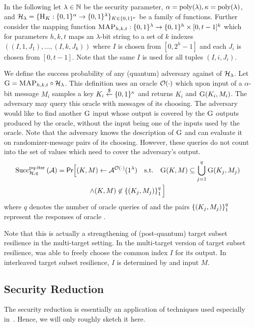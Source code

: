 In the following
let $\lambda\in\NN$ be the security parameter, $\alpha=\poly(\lambda),\kappa =\poly(\lambda)$, and
$\hf_\lambda = \{\h_K: \bin^{\alpha} \rightarrow \bin^{\lambda}\}_{K \in \bin^\kappa}$ be a
family of functions.
Further consider the mapping function $\fmap_{h,k,t}: \bin^{\lambda} \rightarrow \bin^h \times [0,t-1]^k$
which for parameters $h,k,t$ maps an $\lambda$-bit string
to a set of $k$ indexes $((I,1,J_1),\ldots,(I,k,J_k))$
where $I$ is chosen from $[0,2^h-1]$ and each $J_i$ is chosen from $[0,t-1]$.
Note that the same $I$ is used for all tuples $(I, i,J_i)$.

We define the success probability of any (quantum) adversary \A against \pqmmspr
of $\hf_\lambda$. Let $\g =  \fmap_{h,k,t} \circ \hf_\lambda$.
This definition uses an oracle $\oracle(\cdot)$ which upon input of a
$\alpha$-bit message $M_i$ samples a key $K_i \rand\bin^\kappa$
and returns $K_i$ and $\g(K_i,M_i)$. The
adversary may query this oracle with messages of its choosing.
The adversary would like to find another $\g$ input
whose output is covered by the $\g$ outputs produced by the oracle,
without the input being one of the inputs used by the oracle.
Note that the adversary knows the
description of $\g$ and can evaluate it on randomizer-message pairs of its
choosing. However, these queries do not count into the set of values which need
to cover the adversary's output.
\begin{multline*}
  \succf{\text{pq-itsr}}{\hf, q}{\adver} = \pr\Big[(K,M)\exec\A^{\oracle(\cdot)}(1^\lambda)
  \quad\text{s.t.}\quad
  \g(K,M)\subseteq\bigcup_{j=1}^{q} \g(K_j,M_{j}) \\
  \wedge (K,M) \not\in \vecify{1}{q}{(K_j,M_{j})}\Big]
\end{multline*}
where $q$ denotes the number of oracle queries of \A and the pairs
$\vecify{1}{q}{(K_j,M_{j})}$ represent the responses of oracle \oracle.

Note that this is actually a strengthening of (post-quantum) target subset resilience
in the multi-target setting. In the multi-target version of target subset
resilience, \A was able to freely choose the common index $I$ for its output.
In interleaved target subset resilience, $I$ is determined by \g and input $M$.

\subsection{Security Reduction}
The security reduction is essentially an application of techniques used
especially in~\cite{Huelsing2016}. Hence, we will only roughly sketch it here.

